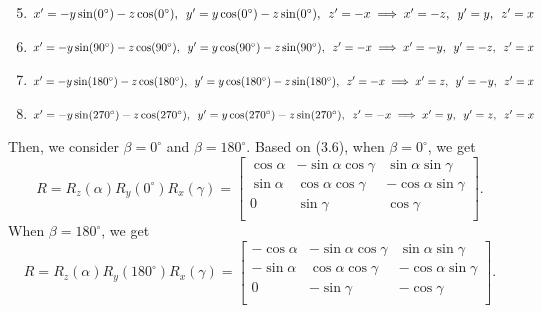 \begin{enumerate}
\setcounter{enumi}{4}
  \item  $x'=-y\sin(0^{\circ})-z\cos(0^{\circ}),\hspace{5pt} y'=y\cos(0^{\circ})-z\sin(0^{\circ}),\hspace{5pt} z'=-x \\\implies x'=-z,\hspace{5pt} y'=y,\hspace{5pt} z'=x$
  \item  $x'=-y\sin(90^{\circ})-z\cos(90^{\circ}),\hspace{5pt} y'=y\cos(90^{\circ})-z\sin(90^{\circ}),\hspace{5pt} z'=-x\\\implies x'=-y,\hspace{5pt} y'=-z,\hspace{5pt} z'=x$
  \item  $x'=-y\sin(180^{\circ})-z\cos(180^{\circ}),\hspace{5pt} y'=y\cos(180^{\circ})-z\sin(180^{\circ}),\hspace{5pt} z'=-x\\\implies x'=z,\hspace{5pt} y'=-y,\hspace{5pt} z'=x$
  \item  $x'=-y\sin(270^{\circ})-z\cos(270^{\circ}),\hspace{5pt} y'=y\cos(270^{\circ})-z\sin(270^{\circ}),\hspace{5pt} z'=-x\\\implies x'=y, \hspace{5pt}y'=z,\hspace{5pt} z'=x$
  \label{3Drotation24situations2}
\end{enumerate}
Then, we consider  $\beta=0^{\circ}$ and $\beta=180^{\circ}$. Based on (3.6), when $\beta=0^{\circ}$, we get
\begin{equation}
\label{equation:beta=0}
R=R_{z}(\alpha)R_{y}(0^{\circ})R_{x}(\gamma)=
\begin{bmatrix}
\cos\alpha&-\sin\alpha\cos\gamma&\sin\alpha\sin\gamma\\
\sin\alpha&\cos\alpha\cos\gamma&-\cos\alpha\sin\gamma\\
0&          \sin\gamma&\cos\gamma\\
\end{bmatrix}.
\end{equation}
When $\beta=180^{\circ}$, we get
\begin{equation}
\label{equation:beta=180}
R=R_{z}(\alpha)R_{y}(180^{\circ})R_{x}(\gamma)=
\begin{bmatrix}
-\cos\alpha&-\sin\alpha\cos\gamma&\sin\alpha\sin\gamma\\
-\sin\alpha&\cos\alpha\cos\gamma&-\cos\alpha\sin\gamma\\
0&                               -\sin\gamma&-\cos\gamma\\
\end{bmatrix}.
\end{equation}
